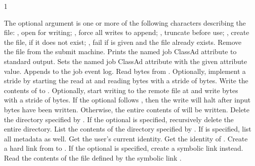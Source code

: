 \begin{ManPage}{\label{man-condor-chirp}}{1}
\begin{description}
{    The optional  argument is one or more of 
    the following characters describing the  file:
      ,  open for writing;
      ,  force all writes to append;
      ,  truncate before use;
      ,  create the file, if it does not exist;
      ,  fail if  is given and the file already exists.
    }
    {Remove the  file from the submit machine.}
    {Prints the named job ClassAd attribute to standard output.}
    {Sets the named job ClassAd attribute with the given attribute value.}
    {Appends  to the job event log.}
    {Read  bytes from . Optionally,
    implement a stride by
    starting the read at  and reading  bytes
    with a stride of  bytes.}
    {Write the contents of  to .
    Optionally, start writing to the remote file at  and write
     bytes with a stride of  bytes.  If the optional
     follows , then the
    write will halt after  input bytes have been written.
    Otherwise, the entire contents of  will be written.}
    {Delete the directory specified by . 
    If the optional  is specified, 
    recursively delete the entire directory.}
    {List the contents of the directory specified by . 
    If  is specified, list all metadata as well.}
    {Get the user's current identity.}
    {Get the identity of .}
    {Create a hard link from  to . 
    If the optional  is specified, create a symbolic link instead.}
    {Read the contents of the file defined by the symbolic link 
    .}

\end{description}
\end{ManPage}
